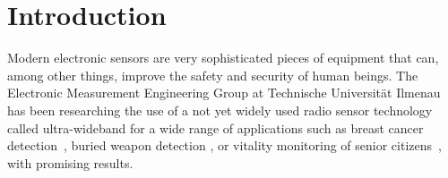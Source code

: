 \documentclass[a4paper, 11pt, oneside]{Thesis}  %
\begin{document}
%






\mainmatter	  %
\pagestyle{fancy}  %
\lhead[\rm\thepage]{\fancyplain{}{\sl{\rightmark}}}

\chapter{Introduction}



Modern electronic sensors are very sophisticated pieces of equipment that can, among other things, improve the safety and security of human beings. The Electronic Measurement Engineering Group at Technische Universität Ilmenau has been researching the use of a not yet widely used radio sensor technology called ultra-wideband for a wide range of applications such as breast cancer detection~\cite{UWBBreastCancer}, buried weapon detection \cite{UWBWeaponDetect}, or vitality monitoring of senior citizens~\cite{UWBElders}, with promising results.
\end{document}
